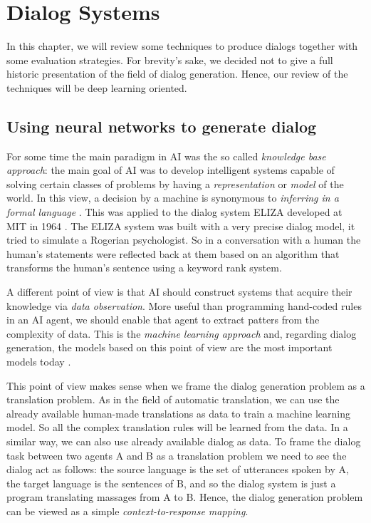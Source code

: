 \chapter{Dialog Systems}
\label{ch:03-dialog-systems}

 In this chapter, we will review some techniques to produce dialogs together with some evaluation strategies. For brevity's sake, we decided not to give a full historic presentation of the field of dialog generation. Hence, our review of the techniques will be deep learning oriented.

\section{Using neural networks to generate dialog}
\label{ch:03-gen}

\par For some time the main paradigm in AI was the so called \textit{knowledge base approach}: the main goal of AI was to develop intelligent systems capable of solving certain classes of problems by having a \textit{representation} or \textit{model} of the world. In this view, a decision by a machine is synonymous to \textit{inferring in a formal language} \cite{McCarthy}. This was applied to the dialog system ELIZA developed at MIT in 1964 \cite{Weizenbaum}. The ELIZA system was built with a very precise dialog model, it tried to simulate a Rogerian psychologist. So in a conversation with a human the human's statements were reflected back at them based on an algorithm that transforms the human's sentence using a keyword rank system.

\par A different point of view is that AI should construct systems that acquire their knowledge via \textit{data observation}. More useful than programming hand-coded rules in an AI agent, we should enable that agent to extract patters from the complexity of data. This is the \textit{machine learning approach} and, regarding dialog generation, the models based on this point of view are the most important models today \cite{BordesW16, Lowe:2016, Serban:2016c, Serban:2016a, Shao:2017, Wen}.

This point of view makes sense when we frame the dialog generation problem as a translation problem. As in the field of automatic translation, we can use the already available human-made translations as data to train a machine learning model. So all the complex translation rules will be learned from the data. In a similar way, we can also use already available dialog as data. To frame the dialog task between two agents A and B as a translation problem we need to see the dialog act as follows: the source language is the set of utterances spoken by A, the target language is the sentences of B, and so the dialog system is just a program translating massages from A to B. Hence, the dialog generation problem can be viewed as a simple \textit{context-to-response mapping}.

